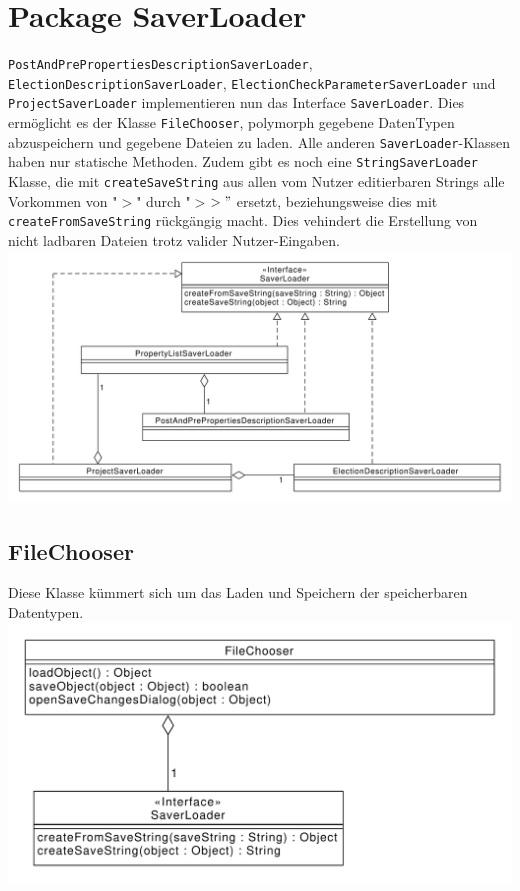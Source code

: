 \documentclass[a4paper]{scrreprt}
\begin{document}
\section{Package SaverLoader}
\verb!PostAndPrePropertiesDescriptionSaverLoader!, \verb!ElectionDescriptionSaverLoader!, \verb!ElectionCheckParameterSaverLoader! und \verb!ProjectSaverLoader! implementieren nun das Interface \verb!SaverLoader!. Dies ermöglicht es der Klasse \verb!FileChooser!, polymorph gegebene DatenTypen abzuspeichern und gegebene Dateien zu laden.
Alle anderen \verb!SaverLoader!-Klassen haben nur statische Methoden.
Zudem gibt es noch eine \verb!StringSaverLoader! Klasse, die mit \verb!createSaveString! aus allen vom Nutzer editierbaren Strings alle Vorkommen von "$>$" durch "$>$$>"$ ersetzt, beziehungsweise dies mit \verb!createFromSaveString! rückgängig macht. Dies vehindert die Erstellung von nicht ladbaren Dateien trotz valider Nutzer-Eingaben.\\
\includegraphics[scale=0.5]{SaverLoader.pdf}

\subsection{FileChooser}
Diese Klasse kümmert sich um das Laden und Speichern der speicherbaren Datentypen.
\\
\includegraphics[scale=0.5]{FileChooser.pdf}
\end{document}
